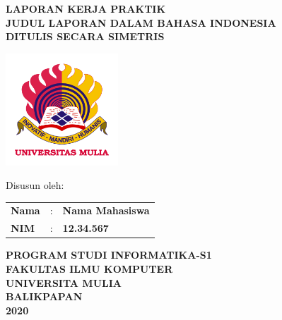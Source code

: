 \documentclass[oneside,listof=totoc]{scrbook}
\newcommand{\JudulLaporanKP}{JUDUL LAPORAN DALAM BAHASA INDONESIA \\ DITULIS SECARA SIMETRIS}
\newcommand{\NamaMahasiswa}{Nama Mahasiswa}
\newcommand{\NIM}{12.34.567}
\newcommand{\TahunPembuatan}{2020}
\begin{document}
\frontmatter
\pagestyle{plain}

\clearpage
\thispagestyle{empty}

\begin{center}
  \normalsize{\textbf{LAPORAN KERJA PRAKTIK}\\
  \vspace{1.0cm}
  \textbf{\JudulLaporanKP}}
\end{center}

\vspace{3.0cm}

\begin{minipage}{12.2cm}
  \centering
    \includegraphics[width=4.20cm]{gambar/logo_um}
\end{minipage}

\vspace{2.5cm}

\begin{center}
  \normalsize{Disusun oleh:}\\
  \vspace{0.2cm}
  \begin{minipage}{\textwidth}
    \begin{center}
      \begin{tabular}{l r l}
        \textbf{Nama} & : & \textbf{\NamaMahasiswa}\\
        \textbf{NIM}  & : & \textbf{\NIM}
      \end{tabular}
    \end{center}
  \end{minipage}
\end{center}

\vspace{3.0cm}

\begin{center}
  \normalsize{\textbf{PROGRAM STUDI INFORMATIKA-S1}}\\
  \normalsize{\textbf{FAKULTAS ILMU KOMPUTER}}\\
  \normalsize{\textbf{UNIVERSITA MULIA}}\\
  \normalsize{\textbf{BALIKPAPAN}}\\
  \normalsize{\textbf{\TahunPembuatan}}
\end{center}
\end{document}

